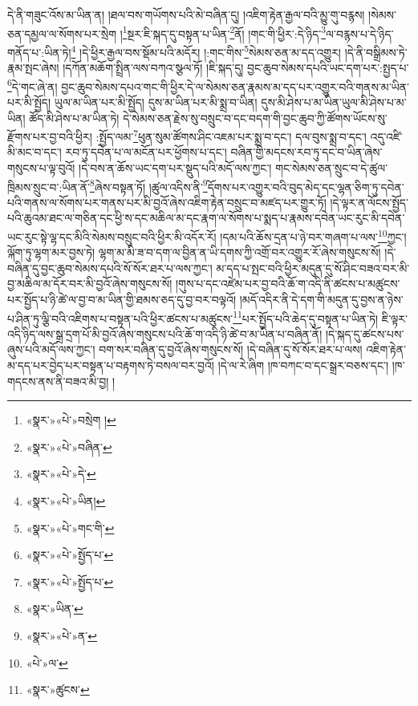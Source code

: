 དེ་ནི་གཟུང་འོས་མ་ཡིན་ན། །ཐལ་བས་གཡོགས་པའི་མེ་བཞིན་དུ། །འཇིག་རྟེན་རྒྱལ་བའི་མྱུ་གུ་བརྙས། །སེམས་ཅན་དམྱལ་ལ་སོགས་པར་སྲེག །\footnote{«སྣར་»«པེ་»བསྲེག །}སྔར་ཇི་སྐད་དུ་བསྟན་པ་ཡིན་\footnote{«སྣར་»«པེ་»བཞིན་}ནོ། །གང་གི་ཕྱིར་:དེ་ཉིད་\footnote{«སྣར་»«པེ་»དེ་}ལ་བརྙས་པ་དེ་ཉིད་གནོད་པ་:ཡིན་ཏེ།\footnote{«སྣར་»«པེ་»ཡིན།} །དེ་ཕྱིར་རྒྱལ་བས་སྡོམ་པའི་མདོར། །:གང་གིས་\footnote{«སྣར་»«པེ་»གང་གི་}སེམས་ཅན་མ་དད་འགྱུར། །དེ་ནི་བསྒྲིམས་ཏེ་རྣམ་སྤང་ཞེས། །དཀོན་མཆོག་སྤྲིན་ལས་བཀའ་སྩལ་ཏོ། །ཇི་སྐད་དུ། བྱང་ཆུབ་སེམས་དཔའི་ཡང་དག་པར་:སྤྱད་པ་\footnote{«སྣར་»«པེ་»སྤྱོད་པ་}དེ་གང་ཞེ་ན། བྱང་ཆུབ་སེམས་དཔའ་གང་གི་ཕྱིར་དེ་ལ་སེམས་ཅན་རྣམས་མ་དད་པར་འགྱུར་བའི་གནས་མ་ཡིན་པར་མི་སྤྱོད། ཡུལ་མ་ཡིན་པར་མི་སྤྱོད། དུས་མ་ཡིན་པར་མི་སྨྲ་བ་ཡིན། དུས་མི་ཤེས་པ་མ་ཡིན་ཡུལ་མི་ཤེས་པ་མ་ཡིན། ཚོད་མི་ཤེས་པ་མ་ཡིན་ཏེ། དེ་སེམས་ཅན་རྗེས་སུ་བསྲུང་བ་དང་བདག་གི་བྱང་ཆུབ་ཀྱི་ཚོགས་ཡོངས་སུ་རྫོགས་པར་བྱ་བའི་ཕྱིར། :སྤྱོད་ལམ་\footnote{«སྣར་»«པེ་»སྤྱོད་པ་}ཕུན་སུམ་ཚོགས་ཤིང་འཇམ་པར་སྨྲ་བ་དང་། དལ་བུས་སྨྲ་བ་དང་། འདུ་འཛི་མི་མང་བ་དང་། རབ་ཏུ་དབེན་པ་ལ་མངོན་པར་ཕྱོགས་པ་དང་། བཞིན་གྱི་མདངས་རབ་ཏུ་དང་བ་ཡིན་ཞེས་གསུངས་པ་ལྟ་བུའོ། །དེ་བས་ན་ཆོས་ཡང་དག་པར་སྡུད་པའི་མདོ་ལས་ཀྱང་། གང་སེམས་ཅན་སྲུང་བ་དེ་ཚུལ་ཁྲིམས་སྲུང་བ་:ཡིན་ནོ་\footnote{«སྣར་»ཡིན་}ཞེས་བསྟན་ཏོ། །ཚུལ་འདིས་ནི་\footnote{«སྣར་»«པེ་»ན་}དོགས་པར་འགྱུར་བའི་བུད་མེད་དང་ལྷན་ཅིག་ཏུ་དབེན་པའི་གནས་ལ་སོགས་པར་གནས་པར་མི་བྱའོ་ཞེས་འཇིག་རྟེན་བསྲུང་བ་མཛད་པར་གྱུར་ཏོ། །དེ་ལྟར་ན་ལོངས་སྤྱོད་པའི་ཆུའམ་ཐང་ལ་གཅིན་དང་ཕྱི་ས་དང་མཆིལ་མ་དང་རྣག་ལ་སོགས་པ་སྨད་པ་རྣམས་དབེན་ཡང་རུང་མི་དབེན་ཡང་རུང་སྟེ་ལྷ་དང་མིའི་སེམས་བསྲུང་བའི་ཕྱིར་མི་འདོར་རོ། །དམ་པའི་ཆོས་དྲན་པ་ཉེ་བར་གཞག་པ་ལས་\footnote{«པེ་»ལ་}ཀྱང་། ལྐོག་ཏུ་ལྷག་མར་བྱས་ཏེ། ལྷག་མ་མི་ཟ་བ་དག་ལ་བྱིན་ན་ཡི་དགས་ཀྱི་འགྲོ་བར་འགྱུར་རོ་ཞེས་གསུངས་སོ། །དེ་བཞིན་དུ་བྱང་ཆུབ་སེམས་དཔའི་སོ་སོར་ཐར་པ་ལས་ཀྱང་། མ་དད་པ་སྤང་བའི་ཕྱིར་མདུན་དུ་སོ་ཤིང་བཟའ་བར་མི་བྱ་མཆིལ་མ་དོར་བར་མི་བྱའོ་ཞེས་གསུངས་སོ། །གུས་པ་དང་འཛེམ་པར་བྱ་བའི་ཆོ་ག་འདི་ནི་ཚངས་པ་མཚུངས་པར་སྤྱོད་པ་ཉི་ཚེ་ལ་བྱ་བ་མ་ཡིན་གྱི་ཐམས་ཅད་དུ་བྱ་བར་བལྟའོ། །མདོ་འདིར་ནི་དེ་དག་གི་མདུན་དུ་བྱས་ན་ཉེས་པ་ཤིན་ཏུ་ལྕི་བའི་འཇིགས་པ་བསྟན་པའི་ཕྱིར་ཚངས་པ་མཚུངས་\footnote{«སྣར་»ཚུངས་}པར་སྤྱོད་པའི་ཆེད་དུ་བསྟན་པ་ཡིན་ཏེ། ཇི་ལྟར་འདི་ཉིད་ལས་སྒྲ་དྲག་པོ་མི་བྱའོ་ཞེས་གསུངས་པའི་ཆོ་ག་འདི་ཉི་ཚེ་བ་མ་ཡིན་པ་བཞིན་ནོ། །དེ་སྐད་དུ་ཚངས་པས་ཞུས་པའི་མདོ་ལས་ཀྱང་། བག་སར་བཞིན་དུ་བྱའོ་ཞེས་གསུངས་སོ། །དེ་བཞིན་དུ་སོ་སོར་ཐར་པ་ལས། འཇིག་རྟེན་མ་དད་པར་བྱེད་པར་བསྟན་པ་བརྟགས་ཏེ་བསལ་བར་བྱའོ། །དེ་ལ་རེ་ཞིག །ཁ་བཀང་བ་དང་སྒྲར་བཅས་དང་། །ཁ་གདངས་ནས་ནི་བཟའ་མི་བྱ། །
